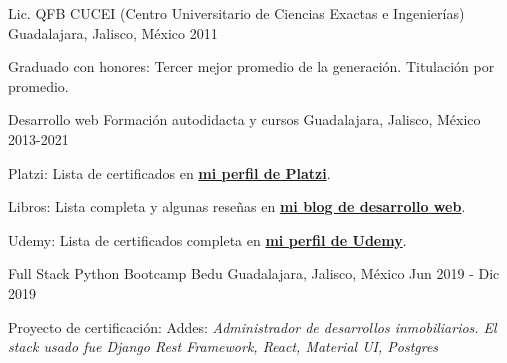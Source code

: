 

\begin{cventries}
  \cventry
    {Lic. QFB}
    {CUCEI (Centro Universitario de Ciencias Exactas e Ingenierías)}
    {Guadalajara, Jalisco, México}
    {2011}
    {
      \begin{cvitems}
        \item {Graduado con honores: Tercer mejor promedio de la generación. Titulación por promedio.}
      \end{cvitems}
    }
    \cventry
    {Desarrollo web}
    {Formación autodidacta y cursos}
    {Guadalajara, Jalisco, México}
    {2013-2021}
    {
      \begin{cvitems}
        \item {Platzi: Lista de certificados en \color{gray} \textbf{\href{https://platzi.com/@eduardo-zepeda/}{mi perfil de Platzi}}.}
        \item {Libros: Lista completa y algunas reseñas en \color{gray} \textbf{ \href{https://coffeebytes.dev/libros-que-he-leido-y-resenas/}{mi blog de desarrollo web}}.}
        \item {Udemy: Lista de certificados completa en \color{gray} \textbf{\href{https://www.udemy.com/user/carlos-eduardo-magallon-zepeda/}{mi perfil de Udemy}}.}
      \end{cvitems}
    }

    \cventry
    {Full Stack Python Bootcamp}
    {Bedu}
    {Guadalajara, Jalisco, México}
    {Jun 2019 - Dic 2019}
    {
      \begin{cvitems}
        \item {Proyecto de certificación: Addes: \textit{Administrador de desarrollos inmobiliarios. El stack usado fue Django Rest Framework, React, Material UI, Postgres}}
      \end{cvitems}
    }
\end{cventries}

